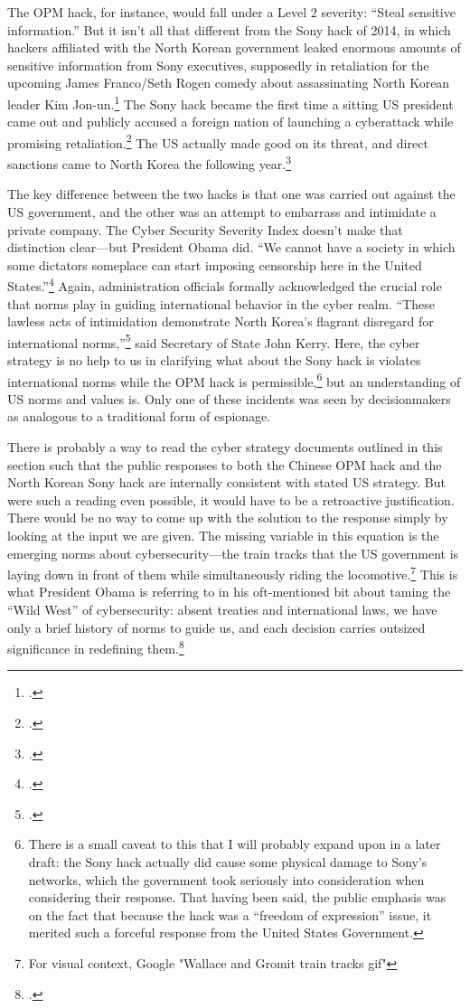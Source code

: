 \documentclass[12pt]{article}
\begin{document}
The OPM hack, for instance, would fall under a Level 2 severity: ``Steal sensitive information.'' But it isn't all that different from the Sony hack of 2014, in which hackers affiliated with the North Korean government leaked enormous amounts of sensitive information from Sony executives, supposedly in retaliation for the upcoming James Franco/Seth Rogen comedy about assassinating North Korean leader Kim Jon-un.\footcite{barnes_sony_2017} The Sony hack became the first time a sitting US president came out and publicly accused a foreign nation of launching a cyberattack while promising retaliation.\footcite{sanger_u.s._2017} The US actually made good on its threat, and direct sanctions came to North Korea the following year.\footcite{lederman_us_2015} 

The key difference between the two hacks is that one was carried out against the US government, and the other was an attempt to embarrass and intimidate a private company. The Cyber Security Severity Index doesn't make that distinction clear---but President Obama did. ``We cannot have a society in which some dictators someplace can start imposing censorship here in the United States.''\footcite{perez_obama_2014} Again, administration officials formally acknowledged the crucial role that norms play in guiding international behavior in the cyber realm. ``These lawless acts of intimidation demonstrate North Korea's flagrant disregard for international norms,''\footcite{perez_obama_2014} said Secretary of State John Kerry. Here, the cyber strategy is no help to us in clarifying what about the Sony hack is violates international norms while the OPM hack is permissible,\footnote{There is a small caveat to this that I will probably expand upon in a later draft: the Sony hack actually did cause some physical damage to Sony's networks, which the government took seriously into consideration when considering their response. That having been said, the public emphasis was on the fact that because the hack was a ``freedom of expression'' issue, it merited such a forceful response from the United States Government.} but an understanding of US norms and values is. Only one of these incidents was seen by decisionmakers as analogous to a traditional form of espionage.

There is probably a way to read the cyber strategy documents outlined in this section such that the public responses to both the Chinese OPM hack and the North Korean Sony hack are internally consistent with stated US strategy. But were such a reading even possible, it would have to be a retroactive justification. There would be no way to come up with the solution to the response simply by looking at the input we are given. The missing variable in this equation is the emerging norms about cybersecurity---the train tracks that the US government is laying down in front of them while simultaneously riding the locomotive.\footnote{For visual context, Google "Wallace and Gromit train tracks gif"} This is what President Obama is referring to in his oft-mentioned bit about taming the ``Wild West'' of cybersecurity: absent treaties and international laws, we have only a brief history of norms to guide us, and each decision carries outsized significance in redefining them.\footcite{sanger_u.s._2017}
\end{document}
